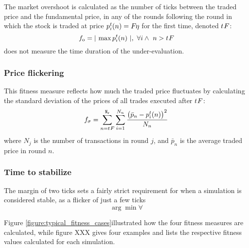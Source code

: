 The market overshoot is calculated as the number of ticks between the traded price and the fundamental price, in any of the rounds following the round in which the stock is traded at price $\tradeprice{n}{i} = \fundamentalprice{\eta}$ for the first time, denoted $\round{F}$: 
\begin{equation}\label{eq:overshoot}
\overshoot = \lvert\ \max \tradeprice{n}{i}\ \rvert, \ \forall i \wedge \ n > \round{F}
\end{equation}
\overshoot{} does not measure the time duration of the under-evaluation. 

\subsubsection{Price flickering}
This fitness measure reflects how much the traded price fluctuates by calculating the standard deviation of the prices of all trades executed after $\round{F}$:
\begin{equation}\label{eq:stdev}
\stdev = \sum\limits_{n = \round{F}}^{\nrounds}  \sum\limits_{i=1}^{N_n} \frac{\big(\bar{p}_n - \tradeprice{n}{i}\big)^2}{N_n}
\end{equation}
where $N_j$ is the number of transactions in round $j$, and $\bar{p}_n$ is the average traded price in round $n$.

\subsubsection{Time to stabilize}
The margin of two ticks sets a fairly strict requirement for when a simulation is considered stable, as a flicker of just a few ticks 
\begin{equation}\label{eq:roundstable}
\arg \min \forall 
\end{equation}

Figure \ref{figure:typical_fitness_cases}illustrated how the four fitness measures are calculated, while figure XXX gives four examples and lists the respective fitness values calculated for each simulation.


